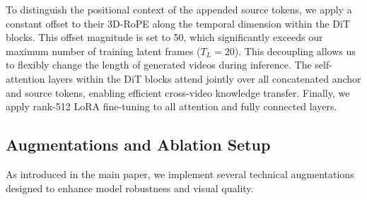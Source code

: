 To distinguish the positional context of the appended source tokens, we apply a constant offset to their 3D-RoPE along the temporal dimension within the DiT blocks. This offset magnitude is set to 50, which significantly exceeds our maximum number of training latent frames ($T_L = 20$). This decoupling allows us to flexibly change the length of generated videos during inference. The self-attention layers within the DiT blocks attend jointly over all concatenated anchor and source tokens, enabling efficient cross-video knowledge transfer. Finally, we apply rank-512 LoRA fine-tuning to all attention and fully connected layers.

\subsection{Augmentations and Ablation Setup}
\label{sec:augmentations_ablation_setup}

As introduced in the main paper, we implement several technical augmentations designed to enhance model robustness and visual quality.

